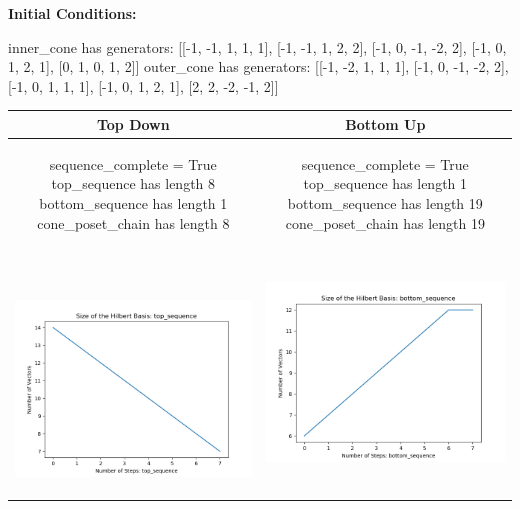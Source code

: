 \documentclass[10pt]{article}
\begin{document}
\textbf{Initial Conditions:}
\begin{SAGE}
inner_cone has generators: 
[[-1, -1, 1, 1, 1], [-1, -1, 1, 2, 2], [-1, 0, -1, -2, 2], [-1, 0, 1, 2, 1], [0, 1, 0, 1, 2]]
outer_cone has generators: 
[[-1, -2, 1, 1, 1], [-1, 0, -1, -2, 2], [-1, 0, 1, 1, 1], [-1, 0, 1, 2, 1], [2, 2, -2, -1, 2]]

\end{SAGE}
\begin{tabular}{c|c}
\textbf{Top Down} & \textbf{Bottom Up} \\ \hline  
\begin{SAGE}
	sequence_complete = True
	top_sequence has length 8
	bottom_sequence has length 1
	cone_poset_chain has length 8
\end{SAGE} 
&
\begin{SAGE}
	sequence_complete = True
	top_sequence has length 1
	bottom_sequence has length 19
	cone_poset_chain has length 19
\end{SAGE} 
\\ \hline
\
\begin{minipage}{.45\textwidth}
\includegraphics[width=\textwidth]{"DATA/5d/5 generators 2 bound A/top_sequence SIZE"}
\end{minipage} &
\begin{minipage}{.45\textwidth}
\includegraphics[width=\textwidth]{"DATA/5d/5 generators 2 bound A bottomup/bottom_sequence SIZE"}

\end{minipage}
\end{tabular}
\end{document}
